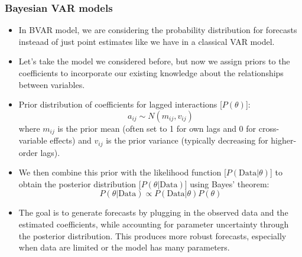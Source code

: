 \documentclass{article}
\begin{document}
\subsubsection{Bayesian VAR models}
\begin{itemize}
    \item In BVAR model, we are considering the probability distribution for forecasts insteaad of just point estimates like we have in a classical VAR model. 
    \item Let's take the model we considered before, but now we assign priors to the coefficients to incorporate our existing knowledge about the relationships between variables.  
  
\item Prior distribution of coefficients for lagged interactions [$P(\theta)$]:  
\begin{equation}  
    a_{ij} \sim N(m_{ij},v_{ij})  
\end{equation}  
where $m_{ij}$ is the prior mean (often set to 1 for own lags and 0 for cross-variable effects) and $v_{ij}$ is the prior variance (typically decreasing for higher-order lags).  
  
\item We then combine this prior with the likelihood function [$P(\text{Data}|\theta)$] to obtain the posterior distribution [$P(\theta|\text{Data})$] using Bayes' theorem:  
\begin{equation}  
    P(\theta|\text{Data}) \propto P(\text{Data}|\theta)P(\theta)  
\end{equation}  
  
\item The goal is to generate forecasts by plugging in the observed data and the estimated coefficients, while accounting for parameter uncertainty through the posterior distribution. This produces more robust forecasts, especially when data are limited or the model has many parameters.  
\end{itemize}
\end{document}

